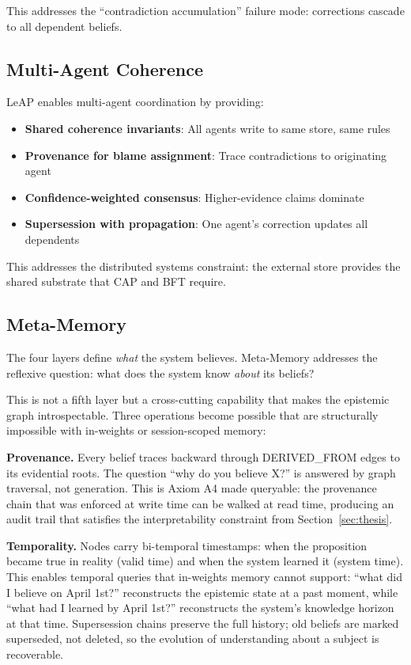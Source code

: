\documentclass[11pt,letterpaper]{article}
\begin{document}
This addresses the ``contradiction accumulation'' failure mode: corrections cascade to all dependent beliefs.

\subsection{Multi-Agent Coherence}

LeAP enables multi-agent coordination by providing:

\begin{itemize}[noitemsep]
    \item \textbf{Shared coherence invariants}: All agents write to same store, same rules
    \item \textbf{Provenance for blame assignment}: Trace contradictions to originating agent
    \item \textbf{Confidence-weighted consensus}: Higher-evidence claims dominate
    \item \textbf{Supersession with propagation}: One agent's correction updates all dependents
\end{itemize}

This addresses the distributed systems constraint: the external store provides the shared substrate that CAP and BFT require.

\subsection{Meta-Memory}

The four layers define \textit{what} the system believes. Meta-Memory addresses the reflexive question: what does the system know \textit{about} its beliefs?

This is not a fifth layer but a cross-cutting capability that makes the epistemic graph introspectable. Three operations become possible that are structurally impossible with in-weights or session-scoped memory:

\textbf{Provenance.} Every belief traces backward through DERIVED\_FROM edges to its evidential roots. The question ``why do you believe X?'' is answered by graph traversal, not generation. This is Axiom A4 made queryable: the provenance chain that was enforced at write time can be walked at read time, producing an audit trail that satisfies the interpretability constraint from Section~\ref{sec:thesis}.

\textbf{Temporality.} Nodes carry bi-temporal timestamps: when the proposition became true in reality (valid time) and when the system learned it (system time). This enables temporal queries that in-weights memory cannot support: ``what did I believe on April 1st?'' reconstructs the epistemic state at a past moment, while ``what had I learned by April 1st?'' reconstructs the system's knowledge horizon at that time. Supersession chains preserve the full history; old beliefs are marked superseded, not deleted, so the evolution of understanding about a subject is recoverable.
\end{document}
